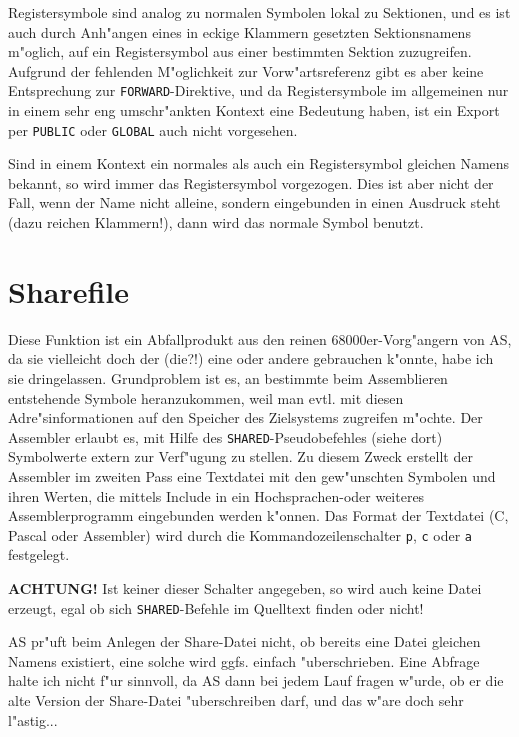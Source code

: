 \documentclass[12pt,a4paper,twoside]{report}
\makeatletter
\newcommand{\bb}[1]{{\bf #1}}
\newcommand{\tty}[1]{{\tt #1}}
\newcommand{\ttindex}[1]{\index{#1@{\tt #1}}}
\makeatother
\begin{document}
Registersymbole sind analog zu normalen Symbolen lokal zu Sektionen,
und es ist auch durch Anh"angen eines in eckige Klammern gesetzten Sektionsnamens
m"oglich, auf ein Registersymbol aus einer bestimmten Sektion zuzugreifen.
Aufgrund der fehlenden M"oglichkeit zur Vorw"artsreferenz gibt es aber keine
Entsprechung zur \tty{FORWARD}-Direktive, und da Registersymbole im allgemeinen
nur in einem sehr eng umschr"ankten Kontext eine Bedeutung haben, ist ein Export
per \tty{PUBLIC} oder \tty{GLOBAL} auch nicht vorgesehen.

Sind in einem Kontext ein normales als auch ein Registersymbol gleichen Namens
bekannt, so wird immer das Registersymbol vorgezogen.  Dies ist aber nicht der
Fall, wenn der Name nicht alleine, sondern eingebunden in einen Ausdruck
steht (dazu reichen Klammern!), dann wird das normale Symbol benutzt.


\section{Sharefile}
\label{ChapShareMain} \ttindex{SHARED}

Diese Funktion ist ein Abfallprodukt aus den reinen 68000er-Vorg"angern
von AS, da sie vielleicht doch der (die?!) eine oder andere gebrauchen
k"onnte, habe ich sie dringelassen.  Grundproblem ist es, an bestimmte
beim Assemblieren entstehende Symbole heranzukommen, weil man evtl. mit
diesen Adre"sinformationen auf den Speicher des Zielsystems zugreifen
m"ochte.  Der Assembler erlaubt es, mit Hilfe des \tty{SHARED}-Pseudobefehles
(siehe dort) Symbolwerte extern zur Verf"ugung zu stellen.  Zu diesem
Zweck erstellt der Assembler im zweiten Pass eine Textdatei mit den
gew"unschten Symbolen und ihren Werten, die mittels Include in ein
Hochsprachen-oder weiteres Assemblerprogramm eingebunden werden k"onnen.
Das Format der Textdatei (C, Pascal oder Assembler) wird durch die
Kommandozeilenschalter \tty{p}, \tty{c} oder \tty{a} festgelegt.
\par
\bb{ACHTUNG!} Ist keiner dieser Schalter angegeben, so wird auch keine
Datei erzeugt, egal ob sich \tty{SHARED}-Befehle im Quelltext finden oder
nicht!
\par
AS pr"uft beim Anlegen der Share-Datei nicht, ob bereits eine Datei gleichen
Namens existiert, eine solche wird ggfs. einfach "uberschrieben.  Eine
Abfrage halte ich nicht f"ur sinnvoll, da AS dann bei jedem Lauf fragen
w"urde, ob er die alte Version der Share-Datei "uberschreiben darf, und das
w"are doch sehr l"astig...
\end{document}

